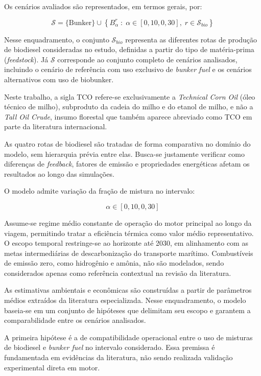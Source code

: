 Os cenários avaliados são representados, em termos gerais, por:

\[
\mathcal{S} = \{\text{Bunker}\} \cup \left\{ B_{\alpha}^{r} \;:\; \alpha \in [0{,}10,0{,}30],\; r \in \mathcal{S}_{bio}\right\}
\]

Nesse enquadramento, o conjunto $\mathcal{S}_{bio}$ representa as diferentes rotas de produção de biodiesel consideradas no estudo, definidas a partir do tipo de matéria-prima (\emph{feedstock}). Já $\mathcal{S}$ corresponde ao conjunto completo de cenários analisados, incluindo o cenário de referência com uso exclusivo de \emph{bunker fuel} e os cenários alternativos com uso de biobunker.

Neste trabalho, a sigla \gls{TCO} refere-se exclusivamente a \emph{Technical Corn Oil} (óleo técnico de milho), subproduto da cadeia do milho e do etanol de milho, e não a \emph{Tall Oil Crude}, insumo florestal que também aparece abreviado como TCO em parte da literatura internacional.

As quatro rotas de biodiesel são tratadas de forma comparativa no domínio do modelo, sem hierarquia prévia entre elas. Busca-se justamente verificar como diferenças de \emph{feedback}, fatores de emissão e propriedades energéticas afetam os resultados ao longo das simulações.

O modelo admite variação da fração de mistura no intervalo:

\[
\alpha \in [0{,}10, 0{,}30]
\]

Assume-se regime médio constante de operação do motor principal ao longo da viagem, permitindo tratar a eficiência térmica como valor médio representativo. O escopo temporal restringe-se ao horizonte até 2030, em alinhamento com as metas intermediárias de descarbonização do transporte marítimo. Combustíveis de emissão zero, como hidrogênio e amônia, não são modelados, sendo considerados apenas como referência contextual na revisão da literatura.

As estimativas ambientais e econômicas são construídas a partir de parâmetros médios extraídos da literatura especializada. Nesse enquadramento, o modelo baseia-se em um conjunto de hipóteses que delimitam seu escopo e garantem a comparabilidade entre os cenários analisados.

A primeira hipótese é a de compatibilidade operacional entre o uso de misturas de biodiesel e \emph{bunker fuel} no intervalo considerado. Essa premissa é fundamentada em evidências da literatura, não sendo realizada validação experimental direta em motor.

